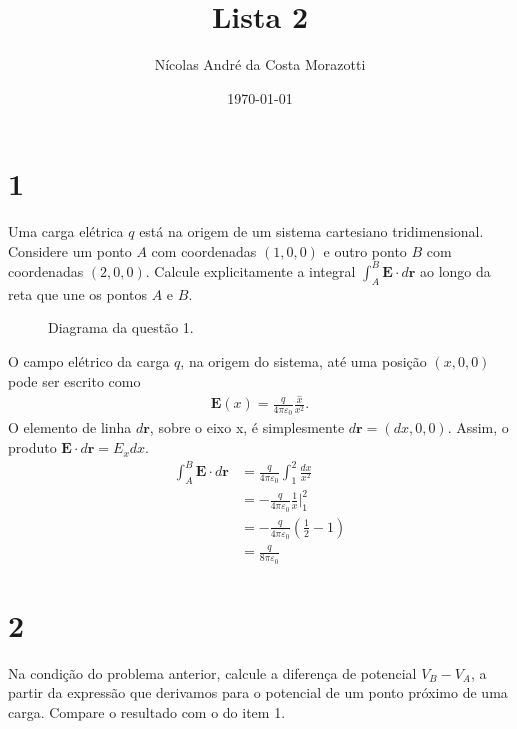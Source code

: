 \documentclass[11pt]{article}
\author{Nícolas André da Costa Morazotti}
\date{\today}
\title{Lista 2}
\begin{document}
\maketitle
\section{1}
\label{sec:org0361fa8}
Uma carga elétrica \(q\) está na origem de um sistema cartesiano
tridimensional. Considere um ponto \(A\) com coordenadas \((1,0,0)\) e outro
ponto \(B\) com coordenadas \((2,0,0)\). Calcule explicitamente a integral
\(\int_A^B \mathbf E\cdot d\mathbf r\) ao longo da reta que une os pontos \(A\) e \(B\).

\begin{figure}[h!]
  \centering
  \caption{Diagrama da questão 1.}
  \label{fig:ex-1}
\end{figure}

O campo elétrico da carga \(q\), na origem do sistema, até uma posição
\((x,0,0)\) pode ser escrito como
\begin{align}
  \mathbf E(x) = \frac q{4\pi\varepsilon_0}\frac {\hat x}{x^2}.
\end{align}
O elemento de linha \(d\mathbf r\), sobre o eixo x, é simplesmente
\(d\mathbf r=(dx,0,0)\). Assim, o produto \(\mathbf E\cdot d\mathbf r=E_x dx\). 
\begin{align}
  \int_A^B\mathbf E\cdot d\mathbf r &= \frac q{4\pi\varepsilon_0}\int_1^2 \frac{dx}{x^2}\\
                             &= -\frac q{4\pi\varepsilon_0}\frac 1x\Big\vert_1^2\\
                             &= -\frac q{4\pi\varepsilon_0}\left(\frac 12 -1\right)\\
                             &= \frac q{8\pi\varepsilon_0}
\end{align}
\section{2}
\label{sec:org8620e40}
Na condição do problema anterior, calcule a diferença de potencial \(V_B-
V_A\), a partir da expressão que derivamos para o potencial de um ponto
próximo de uma carga. Compare o resultado com o do item 1.
\end{document}
